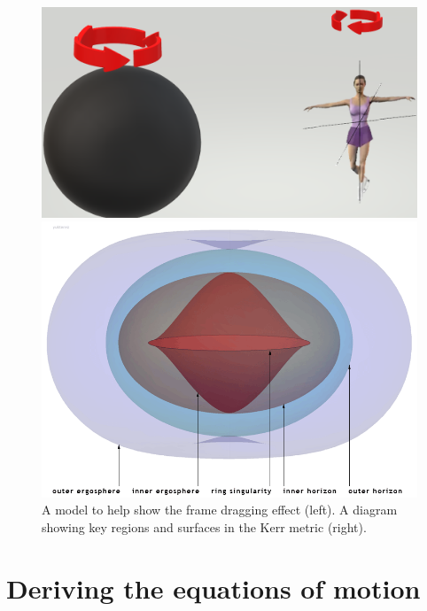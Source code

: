 \documentclass[oneside,openright,frontopenright, singlespacing]{dmathesis}
\begin{document}
\vspace{1em}
\begin{figure}[!ht]
	\centering
	\begin{minipage}{0.5\textwidth}
		\centering
		\includegraphics[width=\linewidth]{img/addison-wesley}
	\end{minipage}%
	\hfill
	\begin{minipage}{0.5\textwidth}
		\centering
		\includegraphics[width=0.9\linewidth]{img/Kerr-surfaces}
	\end{minipage}
	\caption{A model to help show the frame dragging effect (left). A diagram showing key regions and surfaces in the Kerr metric \cite{yukterezkerrnewman} (right).}
	\label{fig:Figure4.1}
\end{figure}

\section{Deriving the equations of motion}\label{sec:Section4.5}
\end{document}
